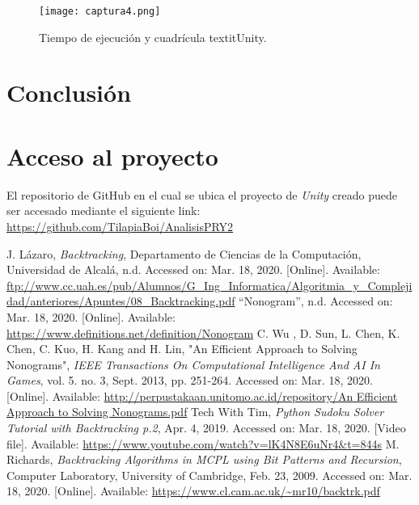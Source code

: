 \documentclass[conference]{IEEEtran}
\begin{document}
\begin{figure}[htbp]
\centerline{\texttt{[image: captura4.png]}}
\caption{Tiempo de ejecución y cuadrícula textit{Unity}.}
\label{Aleatorio20x20}
\end{figure}

\section{Conclusión}


\section{Acceso al proyecto}
El repositorio de GitHub en el cual se ubica el proyecto de \textit{Unity} creado puede ser accesado mediante el siguiente link: \url{https://github.com/TilapiaBoi/AnalisisPRY2}

\begin{thebibliography}{00}
 J. L\'azaro, \textit{Backtracking}, Departamento de Ciencias de la Computaci\'on, Universidad de Alcal\'a, n.d. Accessed on: Mar. 18, 2020. [Online]. Available: \url{ftp://www.cc.uah.es/pub/Alumnos/G_Ing_Informatica/Algoritmia_y_Complejidad/anteriores/Apuntes/08_Backtracking.pdf}
 “Nonogram”, n.d. Accessed on: Mar. 18, 2020. [Online]. Available: \url{https://www.definitions.net/definition/Nonogram}
  C. Wu , D. Sun, L. Chen, K. Chen, C. Kuo, H. Kang and H. Lin, "An Efficient Approach to Solving Nonograms", \textit{IEEE Transactions On Computational Intelligence And AI In Games}, vol. 5. no. 3, Sept. 2013,  pp. 251-264. Accessed on: Mar. 18, 2020. [Online]. Available: \url{http://perpustakaan.unitomo.ac.id/repository/An Efficient Approach to Solving Nonograms.pdf}
 Tech With Tim, \textit{Python Sudoku Solver Tutorial with Backtracking p.2}, Apr. 4, 2019. Accessed on: Mar. 18, 2020. [Video file]. Available: \url{https://www.youtube.com/watch?v=lK4N8E6uNr4&t=844s}
 M. Richards, \textit{Backtracking Algorithms in MCPL using Bit Patterns and Recursion}, Computer Laboratory, University of Cambridge, Feb. 23, 2009. Accessed on: Mar. 18, 2020. [Online]. Available: \url{https://www.cl.cam.ac.uk/~mr10/backtrk.pdf}
\end{thebibliography}
\end{document}
